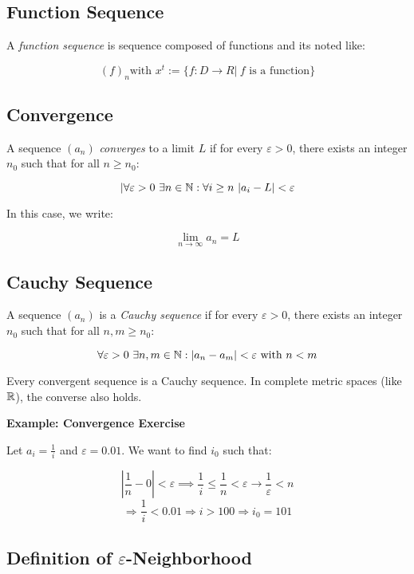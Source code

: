 \subsection{Function Sequence}

A \emph{function sequence} is sequence composed of functions and its noted like:

\[
    {(f)}_n \text{with } x^t := \{ f: D\to R | \ f \text{ is a function}\}
\]

\subsection{Convergence}

A sequence \((a_n)\) \emph{converges} to a limit \(L\) if for every \(\varepsilon > 0\), there exists an 
integer \(n_0\) such that for all \(n \ge n_0\):

\[
    |\forall \varepsilon > 0\ \exists n \in \mathbb{N}: \forall i \ge n\ |a_i - L| < \varepsilon
\]

In this case, we write:

\[
    \lim_{n \to \infty} a_n = L
\]

\subsection{Cauchy Sequence}

A sequence \((a_n)\) is a \emph{Cauchy sequence} if for every \(\varepsilon > 0\), there exists an 
integer \(n_0\) such that for all \(n, m \ge n_0\):

\[
    \forall \varepsilon > 0\ \exists n,m \in \mathbb{N}: |a_n - a_m| < \varepsilon\ \text{with } n < m
\]

Every convergent sequence is a Cauchy sequence. In complete metric spaces (like \(\mathbb{R}\)), the 
converse also holds.

\textbf{Example: Convergence Exercise}

Let \(a_i = \frac{1}{i}\) and \(\varepsilon = 0.01\). We want to find \(i_0\) such that:

\[
    \left|\frac{1}{n} - 0\right| < \varepsilon \implies \frac{1}{i} \le \frac{1}{n} < \varepsilon \rightarrow \frac{1}{\varepsilon} < n
\]
\[
    \Rightarrow \frac{1}{i} < 0.01 \Rightarrow i > 100
    \Rightarrow i_0 = 101
\]

\subsection{Definition of \texorpdfstring{\(\varepsilon\)}{ε}-Neighborhood}

